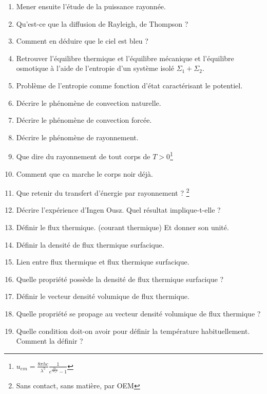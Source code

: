 \documentclass[a4paper, 11pt, hidelinks]{article}
\begin{document}
\begin{enumerate}
    \item Mener ensuite l'étude de la puissance rayonnée. \cite{Chapitre18}
    \item Qu'est-ce que la diffusion de Rayleigh, de Thompson ? \cite{Chapitre18}
    \item Comment en déduire que le ciel est bleu ? \cite{Chapitre18}
    \item Retrouver l'équilibre thermique et l'équilibre mécanique et l'équilibre osmotique à l'aide de l'entropie d'un système isolé $\Sigma_1 + \Sigma_2$. \cite{Chapitre1bis}
    \item Problème de l'entropie comme fonction d'état caractérisant le potentiel. \cite{Chapitre1bis}
    \item Décrire le phénomène de convection naturelle. \cite{Chapitre20}
    \item Décrire le phénomène de convection forcée. \cite{Chapitre20}
    \item Décrire le phénomène de rayonnement. \cite{Chapitre20}
    \item Que dire du rayonnement de tout corps de $T>0$\footnote{$u_{em}=\frac{8\pi h c }{\lambda^5} \frac{1}{e^{\frac{hc}{\lambda k_b T}}-1}$} \cite{Chapitre20}
    \item Comment que ca marche le corps noir déjà. \cite{Chapitre20}
    \item Que retenir du transfert d'énergie par rayonnement ? \footnote{Sans contact, sans matière, par OEM} \cite{Chapitre20}
    \item Décrire l'expérience d'Ingen Ousz. Quel résultat implique-t-elle ? \cite{Chapitre20} 
    \item Définir le flux thermique. (courant thermique) Et donner son unité. \cite{Chapitre20}
    \item Définir la densité de flux thermique surfacique. \cite{Chapitre20}
    \item Lien entre flux thermique et flux thermique surfacique. \cite{Chapitre20}
    \item Quelle propriété possède la densité de flux thermique surfacique ? \cite{Chapitre20}
    \item Définir le vecteur densité volumique de flux thermique. \cite{Chapitre20}
    \item Quelle propriété se propage au vecteur densité volumique de flux thermique ? \cite{Chapitre20}
    \item Quelle condition doit-on avoir pour définir la température habituellement. Comment la définir ? \cite{Chapitre20}

\end{enumerate}
\end{document}
